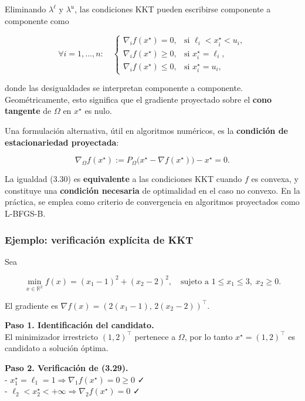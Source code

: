 \documentclass[
  spanish,
  us-letterpaper,
  DIV=11,
  numbers=noendperiod]{scrreprt}
\numberwithin{equation}{section}
\begin{document}
Eliminando \(\lambda^\ell\) y \(\lambda^u\), las condiciones KKT pueden
escribirse componente a componente como

\[
\forall i = 1,\dots,n:
\quad
\begin{cases}
\nabla_i f(x^\star) = 0, & \text{si } \ell_i < x_i^\star < u_i,\\[4pt]
\nabla_i f(x^\star) \ge 0, & \text{si } x_i^\star = \ell_i,\\[4pt]
\nabla_i f(x^\star) \le 0, & \text{si } x_i^\star = u_i,
\end{cases}
\tag{3.29}
\]

donde las desigualdades se interpretan componente a componente.\\
Geométricamente, esto significa que el gradiente proyectado sobre el
\textbf{cono tangente} de \(\Omega\) en \(x^\star\) es nulo.

Una formulación alternativa, útil en algoritmos numéricos, es la
\textbf{condición de estacionariedad proyectada}:

\[
\nabla_\Omega f(x^\star)
:= P_\Omega\big(x^\star - \nabla f(x^\star)\big) - x^\star
= 0.
\tag{3.30}
\]

La igualdad (3.30) es \textbf{equivalente} a las condiciones KKT cuando
\(f\) es convexa, y constituye una \textbf{condición necesaria} de
optimalidad en el caso no convexo. En la práctica, se emplea como
criterio de convergencia en algoritmos proyectados como L-BFGS-B.

\subsubsection{Ejemplo: verificación explícita de
KKT}\label{ejemplo-verificaciuxf3n-expluxedcita-de-kkt}

Sea

\[
\min_{x \in \mathbb{R}^2} f(x) = (x_1 - 1)^2 + (x_2 - 2)^2,
\quad
\text{sujeto a } 1 \le x_1 \le 3,\; x_2 \ge 0.
\tag{3.31}
\]

El gradiente es \(\nabla f(x) = (2(x_1 - 1),\, 2(x_2 - 2))^\top\).

\textbf{Paso 1. Identificación del candidato.}\\
El minimizador irrestricto \((1,2)^\top\) pertenece a \(\Omega\), por lo
tanto \(x^\star = (1,2)^\top\) es candidato a solución óptima.

\textbf{Paso 2. Verificación de (3.29).}\\
- \(x_1^\star = \ell_1 = 1 \Rightarrow \nabla_1 f(x^\star) = 0 \ge 0\)
✓\\
- \(\ell_2 < x_2^\star < +\infty \Rightarrow \nabla_2 f(x^\star) = 0\) ✓
\end{document}
